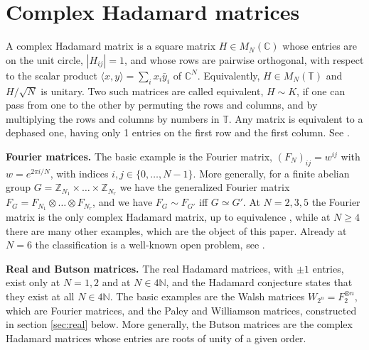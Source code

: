 \documentclass[11pt]{amsart}
\newcommand{\T}{\mathbb T}
\begin{document}
\section{Complex Hadamard matrices}

A complex Hadamard matrix is a square matrix $H\in M_N(\mathbb C)$ whose entries are on the unit circle, $|H_{ij}|=1$, and whose rows are pairwise orthogonal, with respect to the scalar product $\langle x,y\rangle=\sum_ix_i\bar{y}_i$ of $\mathbb C^N$. Equivalently, $H\in M_N(\T)$ and $H/\sqrt N$ is unitary. Two such matrices are called equivalent, $H\sim K$, if one can pass from one to the other by permuting the rows and columns, and by multiplying the rows and columns by numbers in $\T$. Any matrix is equivalent to a dephased one, having only 1 entries on the first row and the first column. See \cite{banicaHM,tz1}.

\medskip

\noindent\textbf{Fourier matrices.} The basic example is the Fourier matrix, $(F_N)_{ij}=w^{ij}$ with $w=e^{2\pi i/N}$, with indices $i,j\in\{0,\ldots,N-1\}$. More generally, for a finite abelian group $G=\mathbb Z_{N_1}\times\ldots\times\mathbb Z_{N_r}$ we have the generalized Fourier matrix $F_G=F_{N_1}\otimes\ldots\otimes F_{N_r}$, and we have $F_G\sim F_{G'}$ iff $G\simeq G'$. At $N=2,3,5$ the Fourier matrix is the only complex Hadamard matrix, up to equivalence \cite{ha1}, while at $N\geq4$ there are many other examples, which are the object of this paper. Already at $N=6$ the classification is a well-known open problem, see \cite{cwt,kar,sz4}.

\medskip

\noindent\textbf{Real and Butson matrices.} The real Hadamard matrices, with $\pm1$ entries, exist only at $N=1,2$ and at $N\in4\mathbb N$, and the Hadamard conjecture states that they exist at all $N\in4\mathbb N$. The basic examples are the Walsh matrices $W_{2^n}=F_2^{\otimes n}$, which are Fourier matrices, and the Paley and Williamson matrices, constructed in section \ref{sec:real} below. More generally, the Butson matrices are the complex Hadamard matrices whose entries are roots of unity of a given order.

\medskip
\end{document}
